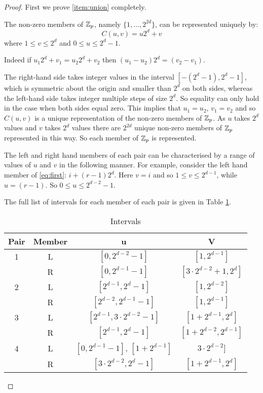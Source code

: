 \begin{proof}
First we prove \ref{item:union} completely.

The non-zero members of $\mathbb{Z}_{p}$, namely $\{1, \ldots, 2^{2d}\}$, can be represented uniquely by:
\begin{equation}
C(u, v) = u2^d + v
\end{equation}
where $1 \leq v \leq 2^d$ and $0 \leq u \leq 2^d - 1$.

Indeed if $u_{1}2^d + v_{1} = u_{2}2^d + v_{2}$ then $(u_{1} - u_{2})2^d = (v_{2} - v_{1})$.

The right-hand side takes integer values in the interval $[-(2^d - 1), 2^d - 1]$, which is symmetric about the origin and smaller than $2^d$ on both sides, whereas the left-hand side takes integer multiple steps of size $2^d$.
So equality can only hold in the case when both sides equal zero.
This implies that $u_1 = u_2$, $v_1 = v_2$ and so $C(u, v)$ is a unique representation of the non-zero members of $\mathbb{Z}_{p}$.
As $u$ takes $2^d$ values and $v$ takes $2^d$ values there are $2^{2d}$ unique non-zero members of $\mathbb{Z}_{p}$ represented in this way.
So each member of $\mathbb{Z}_{p}$ is represented.

The left and right hand members of each pair can be characterised by a range of values of $u$ and $v$ in the following manner.
For example, consider the left hand member of \eqref{eq:first}: $i + (r - 1)2^d$.
Here $v = i$ and so $1 \leq v \leq 2^{d - 1}$, while $u = (r - 1)$.
So $0 \leq u \leq 2^{d - 2} - 1$.

The full list of intervals for each member of each pair is given in Table \ref{tab:intervals}.

\begin{table}[h!]
  \begin{center}
    \begin{tabular}{cccc}
     Pair & Member &                u                  &           V                  \\ \hline
        1 &   L    &   $[0,2^{d-2}-1]$                 &  $[1,2^{d-1}]$               \\
          &   R    &   $[0,2^{d-1}-1]$                 &  $[3 \cdot 2^{d-2}+1,2^{d}]$ \\
        2 &   L    &   $[2^{d-1},2^{d}-1]$             &  $[1,2^{d-2}]$               \\
          &   R    &   $[2^{d-2},2^{d-1}-1]$           &  $[1,2^{d-1}]$               \\
        3 &   L    &   $[2^{d-1},3 \cdot 2^{d-2}-1]$   &  $[1+2^{d-1},2^{d}]$         \\
          &   R    &   $[2^{d-1},2^{d}-1]$             &  $[1+ 2^{d-2},2^{d-1}]$      \\
        4 &   L    &   $[0,2^{d-1}-1]$, $[1+ 2^{d-1}]$ &  $3 \cdot 2^{d-2}]$          \\
          &   R    &   $[3 \cdot 2^{d-2},2^{d}-1]$     &  $[1+2^{d-1},2^{d}]$ 
    \end{tabular}
  \end{center}
  \caption{Intervals}
  \label{tab:intervals}
\end{table}


\end{proof}
